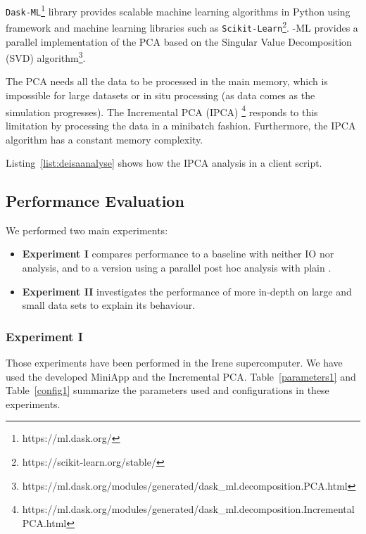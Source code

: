 \texttt{Dask-ML}\footnote{https://ml.dask.org/} library provides scalable machine learning algorithms in Python  using \dask framework and machine learning libraries such as \texttt{Scikit-Learn}\footnote{https://scikit-learn.org/stable/}. \dask-ML provides a parallel implementation of the PCA based on the Singular Value Decomposition (SVD) algorithm\footnote{https://ml.dask.org/modules/generated/dask\_ml.decomposition.PCA.html}.

The PCA needs all the data to be processed in the main memory, which is impossible for large datasets or in situ processing (as data comes as the simulation progresses). The Incremental PCA (IPCA) \footnote{https://ml.dask.org/modules/generated/dask\_ml.decomposition.IncrementalPCA.html} responds to this limitation by processing the data in a minibatch fashion. Furthermore, the IPCA algorithm has a constant memory complexity.    

Listing~\ref{list:deisaanalyse} shows how the IPCA analysis in a \deisa client script.

\subsection{Performance Evaluation}

We performed two main experiments:
\begin{itemize}
    \item \textbf{Experiment I} compares \deisa performance to a baseline with neither IO nor analysis, and to a version using a parallel post hoc analysis with plain \dask.
    \item \textbf{Experiment II} investigates the performance of \deisa more in-depth on large and small data sets to explain its behaviour.
\end{itemize}

\subsubsection{Experiment I}\label{XP1}
Those experiments have been performed in the Irene supercomputer. We have used the developed MiniApp and the Incremental PCA. Table~\ref{parameters1}  and Table~\ref{config1} summarize the parameters used and configurations in these experiments.


